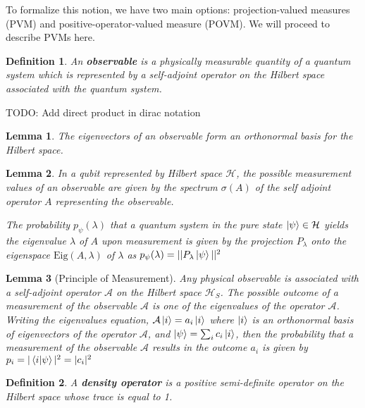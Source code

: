 \documentclass[12pt,twoside,fleqn]{report}
\theoremstyle{thmstyle}
\newtheorem{defn}{Definition}[chapter]
\newtheorem{lemma}{Lemma}[chapter]
\begin{document}
To formalize this notion, we have two main options: projection-valued measures (PVM) and positive-operator-valued measure (POVM). We will proceed to describe PVMs here.

\begin{defn}
    An \textbf{observable} is a physically measurable quantity of a quantum system which is represented by a self-adjoint operator on the Hilbert space associated with the quantum system.
\end{defn}

TODO: Add direct product in dirac notation


\begin{lemma}
    The eigenvectors of an observable form an orthonormal basis for the Hilbert space.
\end{lemma}

\begin{lemma}
    In a qubit represented by Hilbert space $\mathcal{H}$, the possible measurement values of an observable are given by the spectrum $\sigma(A)$ of the self adjoint operator $A$ representing the observable.

    The probability $p_\psi(\lambda)$ that a quantum system in the pure state $\ket{\psi} \in \mathcal{H}$ yields the eigenvalue $\lambda$ of $A$ upon measurement is given by the projection $P_\lambda$ onto the eigenspace $\text{Eig}(A, \lambda)$ of $\lambda$ as $p_\psi(\lambda) = || P_\lambda \ket{\psi} ||^2$
\end{lemma}

\begin{lemma}[Principle of Measurement]
Any physical observable is associated with a self-adjoint operator $\mathcal{A}$ on the Hilbert space $\mathcal{H}_S$. The possible outcome of a measurement of the observable $\mathcal{A}$ is one of the eigenvalues of the operator $\mathcal{A}$. \\
Writing the eigenvalues equation, $\mathcal{A} \ket{i} = a_i \ket{i}$ where $\ket{i}$ is an orthonormal basis of eigenvectors of the operator $\mathcal{A}$, and  $\ket{\psi} = \sum_i c_i \ket{i}$,  then the probability that a measurement of the observable $\mathcal{A}$ results in the outcome $a_i$ is given by $p_i = |\braket{i|\psi}|^2 = |c_i|^2$
\end{lemma}


\begin{defn}
    A \textbf{density operator} is a positive semi-definite operator on the Hilbert space whose trace is equal to 1.
\end{defn}
\end{document}
